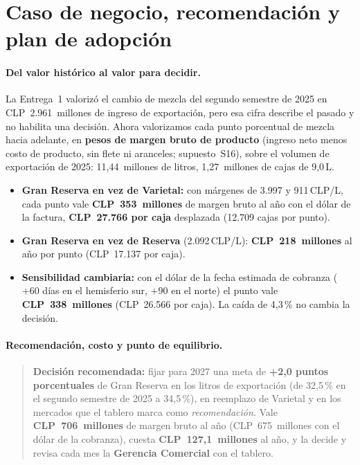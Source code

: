 
\section{Caso de negocio, recomendación y plan de adopción}
\label{sec:negocio}

\paragraph{Del valor histórico al valor para decidir.}
La Entrega~1 valorizó el cambio de mezcla del segundo semestre de 2025 en CLP~2.961~millones de ingreso de exportación, pero esa cifra describe el pasado y no habilita una decisión. Ahora valorizamos cada punto porcentual de mezcla hacia adelante, en \textbf{pesos de margen bruto de producto} (ingreso neto menos costo de producto, sin flete ni aranceles; supuesto~S16), sobre el volumen de exportación de 2025: 11,44~millones de litros, 1,27~millones de cajas de 9,0\,L.
\begin{itemize}\setlength\itemsep{1pt}
  \item \textbf{Gran Reserva en vez de Varietal:} con márgenes de 3.997 y 911\,CLP/L, cada punto vale \textbf{CLP~353~millones} de margen bruto al año con el dólar de la factura, \textbf{CLP~27.766 por caja} desplazada (12.709 cajas por punto).
  \item \textbf{Gran Reserva en vez de Reserva} (2.092\,CLP/L): \textbf{CLP~218~millones} al año por punto (CLP~17.137 por caja).
  \item \textbf{Sensibilidad cambiaria:} con el dólar de la fecha estimada de cobranza ($+60$ días en el hemisferio sur, $+90$ en el norte) el punto vale \textbf{CLP~338~millones} (CLP~26.566 por caja). La caída de 4,3\,\% no cambia la decisión.
\end{itemize}

\paragraph{Recomendación, costo y punto de equilibrio.}\label{par:recomendacion}
\begin{quote}
\textbf{Decisión recomendada:} fijar para 2027 una meta de \textbf{+2,0 puntos porcentuales} de Gran Reserva en los litros de exportación (de 32,5\,\% en el segundo semestre de 2025 a 34,5\,\%), en reemplazo de Varietal y en los mercados que el tablero marca como \emph{recomendación}. Vale \textbf{CLP~706~millones} de margen bruto al año (CLP~675~millones con el dólar de la cobranza), cuesta \textbf{CLP~127,1~millones} al año, y la decide y revisa cada mes la \textbf{Gerencia Comercial} con el tablero.
\end{quote}

